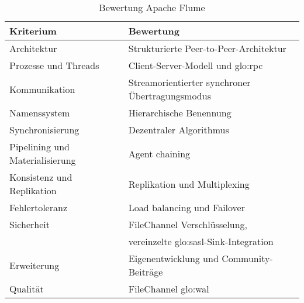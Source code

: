 \begin{table}[ht!]
	\centering
		\begin{tabular}{@{}ll@{}} \toprule
			\textbf{Kriterium} & \textbf{Bewertung} \\ \midrule
			Architektur & Strukturierte Peer-to-Peer-Architektur \\
			Prozesse und Threads & Client-Server-Modell und \gls{glo:rpc} \\
			Kommunikation & Streamorientierter synchroner Übertragungsmodus \\
			Namenssystem & Hierarchische Benennung \\
			Synchronisierung & Dezentraler Algorithmus \\
			Pipelining und Materialisierung & Agent chaining \\
			Konsistenz und Replikation & Replikation und Multiplexing \\
			Fehlertoleranz & Load balancing und Failover \\ 
			Sicherheit & FileChannel Verschlüsselung, \\
			& vereinzelte \acrshort{glo:sasl}-Sink-Integration \\
			Erweiterung & Eigenentwicklung und Community-Beiträge \\
			Qualität & FileChannel \gls{glo:wal} \\
			\bottomrule			
		\end{tabular}
	\caption{Bewertung Apache Flume}
	\label{tab:bewflume}
\end{table}

